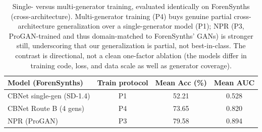 \begin{table}[t]
  \centering
  \caption{Single- versus multi-generator training, evaluated identically on ForenSynths (cross-architecture).
  Multi-generator training (P4) buys genuine partial cross-architecture generalization over a single-generator
  model (P1); NPR (P3, ProGAN-trained and thus domain-matched to ForenSynths' GANs) is stronger still,
  underscoring that our generalization is partial, not best-in-class. The contrast is directional, not a clean
  one-factor ablation (the models differ in training code, loss, and data scale as well as generator coverage).}
  \label{tab:forensynths}
  \small
  \begin{tabular}{lccc}
    \toprule
    Model (ForenSynths) & Train protocol & Mean Acc (\%) & Mean AUC \\
    \midrule
    CBNet single-gen (SD-1.4) & P1 & 52.21 & 0.528 \\
    CBNet Route B (4 gens)    & P4 & 73.65 & 0.820 \\
    NPR (ProGAN)              & P3 & 79.58 & 0.894 \\
    \bottomrule
  \end{tabular}
\end{table}
